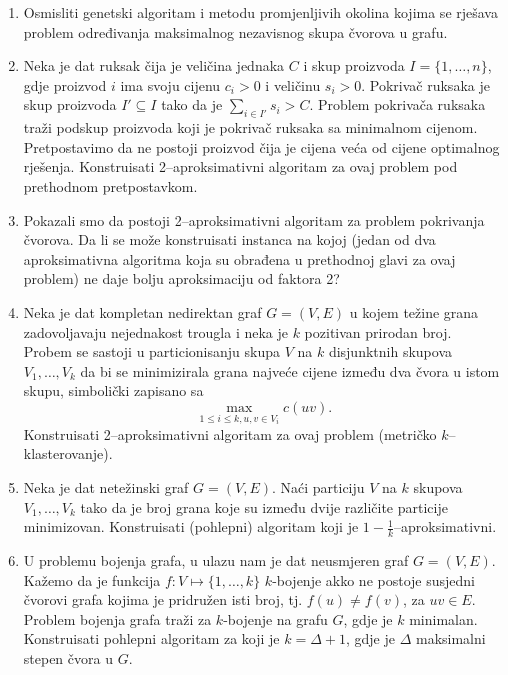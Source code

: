 \documentclass[a4paper, utf8, 11pt, colorlinks]{book}
\begin{document}
\begin{enumerate}
		\item Osmisliti genetski algoritam i metodu promjenljivih okolina kojima se rješava problem određivanja maksimalnog nezavisnog skupa čvorova u grafu.
		\item %
		   Neka je dat ruksak čija je veličina jednaka $C$ i skup proizvoda $I = \{1,\ldots, n\}$, gdje proizvod $i$ ima svoju cijenu $c_i>0$ i veličinu $s_i>0$. Pokrivač ruksaka je skup proizvoda $I' \subseteq I$ tako da je $\sum_{i \in I'} s_i > C$.  Problem pokrivača ruksaka traži podskup proizvoda koji je pokrivač ruksaka sa minimalnom    cijenom.   Pretpostavimo da ne postoji proizvod čija je cijena veća od    cijene optimalnog rješenja. Konstruisati 2--aproksimativni algoritam za ovaj problem pod prethodnom pretpostavkom. 
		   \item Pokazali smo da postoji 2--aproksimativni algoritam za problem pokrivanja čvorova. Da li se može konstruisati instanca na kojoj (jedan od dva aproksimativna algoritma koja su obrađena u prethodnoj glavi za ovaj problem) ne daje bolju aproksimaciju od faktora 2? 
		   \item %
		   Neka je dat kompletan nedirektan graf $G = (V, E)$ u kojem težine grana zadovoljavaju nejednakost trougla i neka je $k$ pozitivan prirodan broj. Probem se sastoji u particionisanju skupa $V$ na $k$ disjunktnih skupova $V_1, \ldots, V_k$ da bi se minimizirala grana najveće cijene između dva čvora u istom skupu,  simbolički zapisano sa
		   $$ \max_{1 \leq i \leq k, u,v \in V_i} c(uv).$$
		   Konstruisati 2--aproksimativni algoritam za ovaj problem (metričko $k$--klasterovanje). 
		\item %
		 Neka je dat netežinski graf $G=(V,E)$. Naći particiju $V$ na $k$ skupova $V_1,\ldots, V_k$ tako da je broj grana koje su između dvije različite particije minimizovan. Konstruisati (pohlepni) algoritam koji je $1-\frac{1}{k}$--aproksimativni. 
		 \item U problemu bojenja grafa, u ulazu nam je dat neusmjeren graf $G = (V,E)$. Kažemo da je funkcija $f:V \mapsto \{1,\ldots, k\}$ $k$-bojenje akko ne postoje susjedni čvorovi grafa kojima je pridružen isti broj, tj. $f(u) \neq f(v)$, za $uv \in E$. Problem bojenja grafa traži za $k$-bojenje na grafu $G$, gdje je $k$ minimalan. Konstruisati pohlepni algoritam za koji je $k = \Delta + 1$, gdje je $\Delta$ maksimalni stepen čvora u $G$. 

\end{enumerate}
\end{document}
